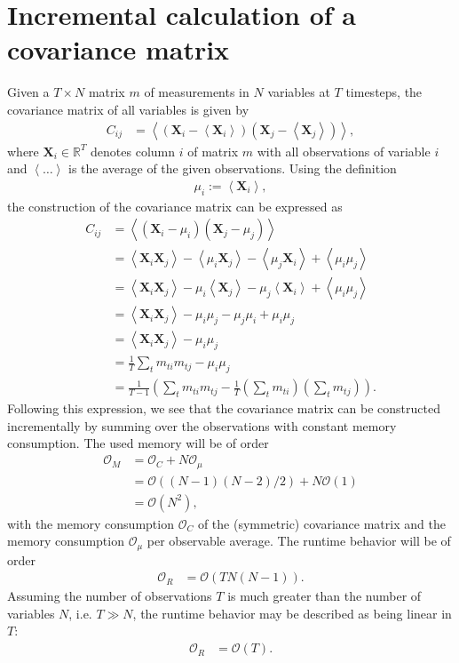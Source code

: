 \documentclass[a4paper]{article}
\newcommand{\X} {\mathbf{X}}
\begin{document}
\section{Incremental calculation of a covariance matrix}
Given a $T\times N$ matrix $m$ of measurements in $N$ variables
at $T$ timesteps, the covariance matrix of all variables is given by
\begin{align}
  C_{ij} &= \left<\left(\X_i- \left<\X_i\right>\right) \left(\X_j-\left<\X_j\right>\right)\right>,
\end{align}
where $\X_i \in \mathbb{R}^T$ denotes column $i$ of matrix $m$ with all observations
of variable $i$ and $\left< \dots \right>$ is the average of the given observations.
Using the definition
\begin{align}
  \mu_i := \left< \X_i \right>,
\end{align}
the construction of the covariance matrix can be expressed as
\begin{align}
  C_{ij} &= \left<\left(\X_i - \mu_i\right) \left(\X_j - \mu_j\right)\right>\\
         &= \left<\X_i \X_j\right> - \left< \mu_i \X_j \right> - \left< \mu_j \X_i \right> + \left< \mu_i \mu_j \right>\\
         &= \left<\X_i \X_j\right> - \mu_i \left<\X_j \right> - \mu_j \left<\X_i\right> + \left< \mu_i \mu_j \right>\\
         &= \left<\X_i \X_j\right> - \mu_i \mu_j - \mu_j \mu_i + \mu_i \mu_j\\
         &= \left<\X_i \X_j\right> - \mu_i \mu_j\\
         &= \frac{1}{T} \sum_t m_{ti} m_{tj} - \mu_i \mu_j\\
         &= \frac{1}{T-1}\left( \sum_t m_{ti} m_{tj} - \frac{1}{T} \left(\sum_t m_{ti}\right) \left(\sum_t m_{tj}\right) \right)
            \label{eq:cov_standard}.
\end{align}
Following this expression, we see that the covariance matrix can be
constructed incrementally by summing over the observations with constant memory consumption.
The used memory will be of order
\begin{align}
  \mathcal{O}_M &= \mathcal{O}_C + N\mathcal{O}_\mu\\
                &= \mathcal{O}\left( (N-1)(N-2) / 2 \right) + N\mathcal{O}\left(1\right)\\
                &= \mathcal{O}\left( N^2 \right),
\end{align}
with the memory consumption $\mathcal{O}_C$ of the (symmetric) covariance matrix and
the memory consumption $\mathcal{O}_\mu$ per observable average.
The runtime behavior will be of order
\begin{align}
  \mathcal{O}_R &= \mathcal{O}\left(T N\left(N-1\right)\right).
\end{align}
Assuming the number of observations $T$ is much greater than the number of variables $N$, i.e. $T \gg N$,
the runtime behavior may be described as being linear in $T$:
\begin{align}
  \mathcal{O}_R &= \mathcal{O}\left(T\right).
\end{align}
\end{document}
